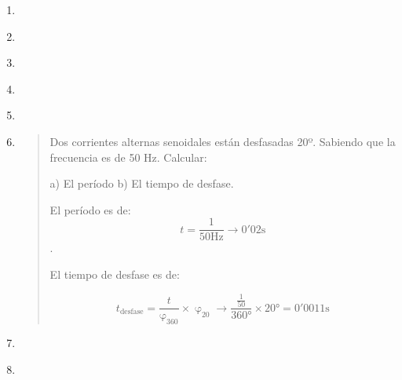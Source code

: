 \documentclass[spanish,openany]{report}
\begin{document}
\begin{enumerate}
	\item
		\begin{quote}
		\end{quote}
		
	\item
		\begin{quote}
		\end{quote}
		
	\item
		\begin{quote}
		\end{quote}
		
	\item
		\begin{quote}
		\end{quote}
		
	\item
		\begin{quote}
		\end{quote}
		
	\item
		\begin{quote}
Dos corrientes alternas senoidales están desfasadas 20º. Sabiendo que la frecuencia es de 50 Hz. Calcular:


a) El período\hspace{5em}  b) El tiempo de desfase.


 El período es de: \[t = \frac{1}{50\si{\hertz}} \to  0'02\si{\second}\].

 El tiempo de desfase es de:

\[t_{\text{desfase}} = \frac{t}{\upvarphi_{360}}\times\upvarphi_{20} \to 
\frac{\frac{1}{50}}{\ang{360}}\times\ang{20} = 0'0011\si{\second}
\]
		\end{quote}
		
	\item
		\begin{quote}
		\end{quote}
		
\clearpage
	\item
		\begin{quote}
		\end{quote}
		

\end{enumerate}
\end{document}
